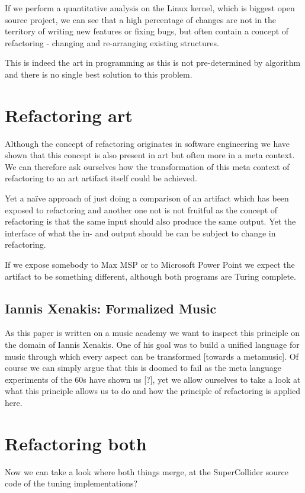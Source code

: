 \documentclass[10pt,twocolumn,letterpaper]{article}
\begin{document}
If we perform a quantitative analysis on the Linux kernel, which is biggest open source project, we can see
that a high percentage of changes are not in the territory of writing new features or fixing bugs, but often 
contain a concept of refactoring - changing and re-arranging existing structures.

This is indeed the art in programming as this is not pre-determined by algorithm and there is no
single best solution to this problem.

\section{Refactoring art}

Although the concept of refactoring originates in software engineering we have shown that this concept is also
present in art but often more in a meta context.
We can therefore ask ourselves how the transformation of this meta context of refactoring to an art artifact itself
could be achieved.

Yet a naïve approach of just doing a comparison of an artifact which has been exposed to refactoring and another one
not is not fruitful as the concept of refactoring is that the same input should also produce the same output.
Yet the interface of what the in- and output should be can be subject to change in refactoring.

If we expose somebody to Max MSP or to Microsoft Power Point we expect the artifact to be something different, although
both programs are Turing complete.

\subsection{Iannis Xenakis: Formalized Music}

As this paper is written on a music academy we want to inspect this principle on the domain of Iannis Xenakis.
One of his goal was to build a unified language for music through which every aspect can be transformed [towards a metamusic].
Of course we can simply argue that this is doomed to fail as the meta language experiments of the 60s have shown us [?], yet we allow ourselves to take a look at what this principle allows us to do and how the principle of refactoring is applied here.


\section{Refactoring both}

Now we can take a look where both things merge, at the SuperCollider source code of the tuning implementations?
\end{document}
